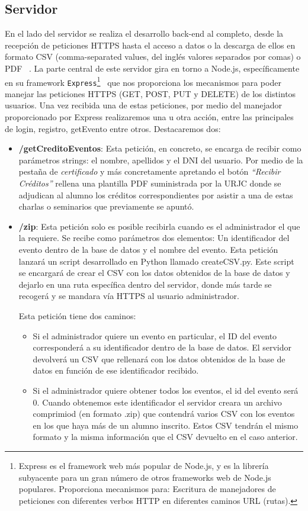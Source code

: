 \documentclass[a4paper, 12pt]{book}
\begin{document}
\subsection{Servidor}
	En el lado del servidor se realiza el desarrollo back-end al completo, desde la recepción de peticiones HTTPS hasta el acceso a datos o la descarga de ellos en formato CSV (comma-separated values, del inglés valores separados por comas) o PDF ~\cite{csvreader}.
	La parte central de este servidor gira en torno a Node.js, específicamente en su framework \texttt{Express}\footnote{Express es el framework web más popular de Node.js, y es la librería subyacente para un gran número de otros frameworks web de Node.js populares. Proporciona mecanismos para: Escritura de manejadores de peticiones con diferentes verbos HTTP en diferentes caminos URL (rutas).}~\cite{angular}  que nos proporciona los mecanismos para poder manejar las peticiones HTTPS (GET, POST, PUT y DELETE) de los distintos usuarios. Una vez recibida una de estas peticiones, por medio del manejador proporcionado por Express realizaremos una u otra acción, entre las principales de login, registro, getEvento entre otros. Destacaremos dos:
	
\begin{itemize}
	\item \textbf{/getCreditoEventos}: Esta petición, en concreto, se encarga de recibir como parámetros strings: el nombre, apellidos y el DNI del usuario. Por medio de la pestaña de \textit{certificado} y más concretamente apretando el botón \textit{``Recibir Créditos''} rellena una plantilla PDF suministrada por la URJC donde se adjudican al alumno los créditos correspondientes por asistir a una de estas charlas o seminarios que previamente se apuntó.
	

	\item \textbf{/zip}: Esta petición solo es posible recibirla cuando es el administrador el que la requiere. Se recibe como parámetros dos elementos: Un identificador del evento dentro de la base de datos y el nombre del evento. Esta petición lanzará un script desarrollado en Python llamado createCSV.py. Este script se encargará de crear el CSV con los datos obtenidos de la base de datos y dejarlo en una ruta específica dentro del servidor, donde más tarde se recogerá y se mandara vía HTTPS al usuario administrador.

Esta petición tiene dos caminos:
\begin{itemize}
	\item  Si el administrador quiere un evento en particular, el ID del evento corresponderá a su identificador dentro de la base de datos. El servidor devolverá un CSV que rellenará con los datos obtenidos de la base de datos en función de ese identificador recibido. 
	\item Si el administrador quiere obtener todos los eventos, el id del evento será 0. Cuando obtenemos este identificador el servidor creara un archivo comprimiod (en formato .zip) que contendrá varios CSV con los eventos en los que haya más de un alumno inscrito. Estos CSV tendrán el mismo formato y la misma información que el CSV devuelto en el caso anterior.
\end{itemize}
\end{itemize}
\end{document}
